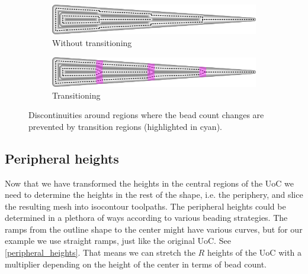 \begin{figure}
\centering
\setlength{\figwidth}{\columnwidth}
\begin{subfigure}{0.9\figwidth}\centering
\includegraphics[width=\columnwidth]{sources/method/wedge_no_transitioning.png}
\caption{Without transitioning}
\end{subfigure}
\begin{subfigure}{0.9\figwidth}\centering
\includegraphics[width=\columnwidth]{sources/method/wedge_transitioning.png}
\caption{Transitioning}
\end{subfigure}
\caption{
Discontinuities around regions where the bead count changes are prevented by transition regions (highlighted in cyan).
}
\label{transitions}
\end{figure}














\subsection{Peripheral heights}\label{sec_peripheral_height_adjustment}
Now that we have transformed the heights in the central regions of the UoC we need to determine the heights in the rest of the shape, i.e. the periphery, and slice the resulting mesh into isocontour toolpaths.
The peripheral heights could be determined in a plethora of ways according to various beading strategies.
The ramps from the outline shape to the center might have various curves,
but for our example we use straight ramps, just like the original UoC.
See \cref{peripheral_heights}.
That means we can stretch the $R$ heights of the UoC with a multiplier depending on the height of the center in terms of bead count.


